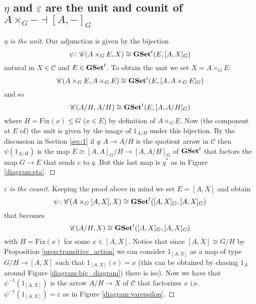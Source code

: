 \documentclass[italian, 12pt, reqno]{article}
\theoremstyle{myteo}
\numberwithin{equation}{section}
\newcommand{\cat}[1]{\mathscr{#1}}
\newcommand{\tgset}{\text{\textbf{GSet}}^t}
\newcommand{\homs}[2]{[#1, #2]}
\newcommand{\fun}[3]{#1\colon#2\to #3}
\begin{document}
\subsection{\(\eta\) and \(\varepsilon\) are the unit and counit of \(A\times_G- \dashv \homs{A}{-}_G\)}

\begin{proof}[\(\eta\) is the unit]
  Our adjunction is given by the bijection
  \[\psi\colon\cat{C}(A\times_G E, X)\cong\tgset(E, \homs{A}{X}_G)\]
  natural in \(X\in\cat{C}\) and \(E\in\tgset\).
  To obtain the unit we set \(X = A\times_G E\):
  \[\cat{C}(A\times_G E, A\times_G E)\cong\tgset(E, \homs{A}{A\times_G E}_G)\]
  and so
  \[\cat{C}(A/H, A/H)\cong\tgset(E, \homs{A}{A/H}_G)\]
  where \(H = \text{Fix}(x)\leq G\) (\(x\in E\)) by definition of \(A\times_G E\).
  Now (the component at \(E\) of) the unit is given by the image of \(1_{A/H}\) under this bijection.
  By the discussion in Section \ref{sec:1} if \(\fun{q}{A}{A/H}\) is the quotient arrow in \(\cat{C}\) then \(\psi(1_{A/H})\) is the map \(E\cong\homs{A}{A}_G/H \to \homs{A}{A/H}_G\) of \(\tgset\) that factors the map \(G\to E\) that sends \(e\) to \(q\).
  But this last map is \(q^*\) as in Figure \ref{diagram:eta}.
\end{proof}

\begin{proof}[\(\varepsilon\) is the counit]
  Keeping the proof above in mind we set \(E = \homs{A}{X}\) and obtain
  \[\psi\colon \cat{C}(A\times_G\homs{A}{X}, X) \cong \tgset(\homs{A}{X}_G, \homs{A}{X}_G)\]
  that becomes
  \[\cat{C}(A/H, X) \cong \tgset(\homs{A}{X}_G, \homs{A}{X}_G)\]
  with \(H = \text{Fix}(x)\) for some \(x\in\homs{A}{X}\).
  Notice that since \(\homs{A}{X}\cong G/H\) by Proposition \ref{prop:transitive_action} we can consider \(1_{\homs{A}{X}}\) as a map of type \(G/H \to \homs{A}{X}\) such that \(1_{\homs{A}{X}}(e) = x\) (this can be obtained by chasing \(1_A\) around Figure \ref{diagram:big_diagram}) there is iso).
  Now we have that \(\psi^{-1}(1_{\homs{A}{X}})\) is the arrow \(A/H\to X\) of \(\cat{C}\) that factorizes \(x\) i.e. \(\psi^{-1}(1_{\homs{A}{X}}) = \varepsilon\) as in Figure \ref{diagram:varepsilon}.
\end{proof}
\end{document}

